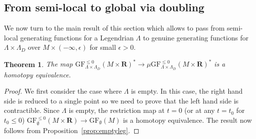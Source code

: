 \documentclass[12pt,a4paper]{article}
\numberwithin{equation}{section}
\newtheorem{thm}[equation]{Theorem}
\theoremstyle{definition}
\theoremstyle{remark}
\newcommand{\R}{\mathbf{R}}
\newcommand{\GF}{\mathrm{GF}}
\begin{document}
\subsection{From semi-local to global via doubling}

We now turn to the main result of this section which allows to pass from semi-local generating functions
for a Legendrian $\Lambda$ to genuine generating functions for $\Lambda\times \Lambda_D$ over $M\times(-\infty,\epsilon)$ for small $\epsilon >0$.

\begin{thm}\label{thm:GFdoubling}
The map $\GF^{\leq 0}_{\Lambda\times \Lambda_D}(M\times \R)^* \to \mu\GF^{\leq 0}_{\Lambda\times \Lambda_D}(M\times \R)^*$ is a homotopy equivalence.
\end{thm}
\begin{proof}
We first consider the case where $\Lambda$ is empty. In this case, the right hand side is reduced to a single point so we need to prove
that the left hand side is contractible.
Since $\Lambda$ is empty, the restriction map at $t=0$ (or at any $t=t_0$ for $t_0\leq 0$) $\GF^{\leq 0}_\emptyset(M\times \R) \to \GF_\emptyset(M)$
is a homotopy equivalence. The result now follows from Proposition~\ref{prop:emptyleg}.


\end{proof}
\end{document}
